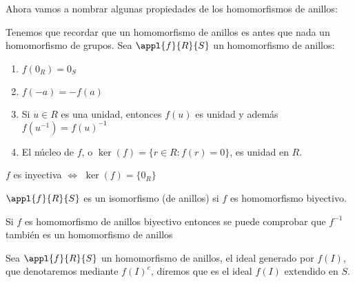 Ahora vamos a nombrar algunas propiedades de los homomorfismos de anillos:

Tenemos que recordar que un homomorfismo de anillos es antes que nada un homomorfismo de grupos. Sea $\appl{f}{R}{S}$ un homomorfismo de anillos:
\begin{enumerate}
\item $f(0_R)=0_S$
\item $f(-a)=-f(a)$
\item Si $u \in R$ es una unidad, entonces $f(u)$ es unidad y además $f(u^{-1})=f(u)^{-1}$
\item El núcleo de $f$, o $\ker(f)=\{ r \in R: f(r)=0 \}$, es unidad en $R$.
\end{enumerate}

\begin{prop}
	$f$ es inyectiva $\Leftrightarrow$ $\ker (f)=\{0_R \}$
\end{prop}

\begin{defn}
	$\appl{f}{R}{S}$ es un isomorfismo (de anillos) si $f$ es homomorfismo biyectivo.
\end{defn}

\begin{prop}
	Si $f$ es homomorfismo de anillos biyectivo entonces se puede comprobar que $f^{-1}$ también es un homomorfismo de anillos
\end{prop}

\begin{defn}
	Sea $\appl{f}{R}{S}$ un homomorfismo de anillos, el ideal generado por $f(I)$, que denotaremos mediante $f(I)^e$, diremos que es el ideal $f(I)$ extendido en $S$.
\end{defn}

